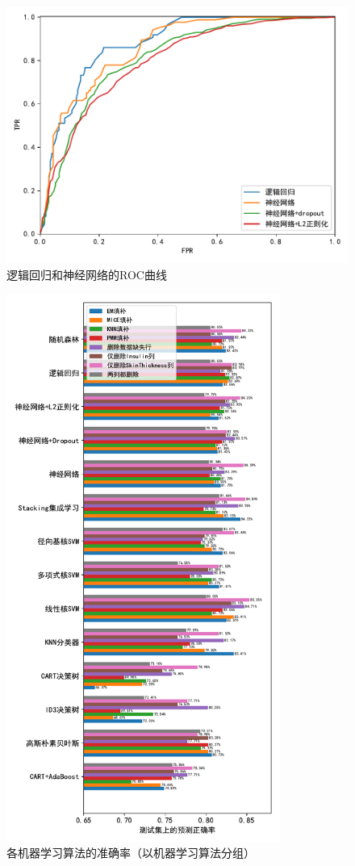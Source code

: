 \documentclass[a4paper]{ctexart}
\begin{document}
\begin{figure}[htbp]
	\centering
	\includegraphics[width=\textwidth]{figure/f5.pdf}
	\caption{逻辑回归和神经网络的ROC曲线}
	\label{figure:ROC曲线}
\end{figure}
\begin{figure}[htbp]
	\centering
	\includegraphics[width=0.8\textwidth]{figure/f1.pdf}
	\caption{各机器学习算法的准确率（以机器学习算法分组）}
	\label{figure:总体正确率}
\end{figure}
\end{document}
